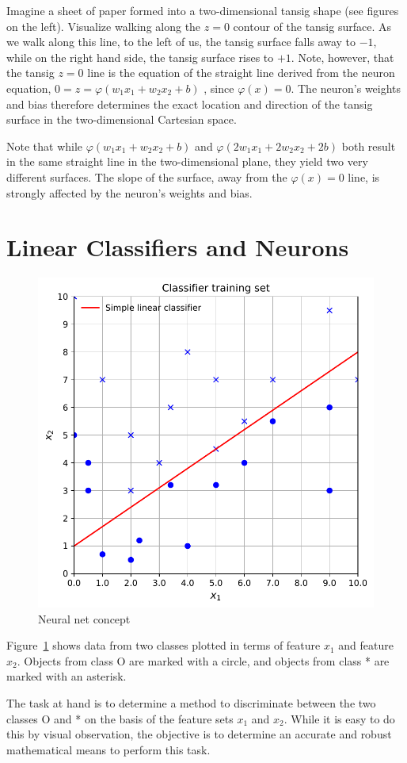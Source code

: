 Imagine a sheet of paper formed into a two-dimensional tansig shape (see figures on the left).  Visualize walking along the $z=0$ contour of the tansig surface.  As we walk along this line, to the left of us, the tansig surface falls away to $-1$, while on the right hand side, the tansig surface rises to $+1$.  Note, however, that the tansig $z=0$ line is the equation of the straight line derived from the neuron equation, $0=z=\varphi(w_1x_1+w_2x_2+b)$ , since $\varphi(x)=0$.  The neuron's weights and bias therefore determines the exact location and direction of the tansig surface in the two-dimensional Cartesian space.  

Note that while $\varphi(w_1x_1+w_2x_2+b)$  and  $\varphi(2w_1x_1+2w_2x_2+2b)$ both result in the same straight line in the two-dimensional plane, they yield two very different surfaces.  The slope of the surface, away from the  $\varphi(x)=0$ line, is strongly affected by the neuron's weights and bias.  

\section{Linear Classifiers and Neurons}

\begin{figure}[tb]
\centering
\includegraphics[width=.6\textwidth]{pic/chC-trainingset}
\caption{Neural net concept\label{fig:chC-trainingset}}
\end{figure}

Figure~\ref{fig:chC-trainingset} shows data from two classes plotted in terms of feature $x_1$ and feature $x_2$.  Objects from class O are marked with a circle, and objects from class * are marked with an asterisk.  

The task at hand is to determine a method to discriminate between the two classes O and * on the basis of the feature sets $x_1$ and $x_2$.  While it is easy to do this by visual observation, the objective is to determine an accurate and robust mathematical means to perform this task.  

